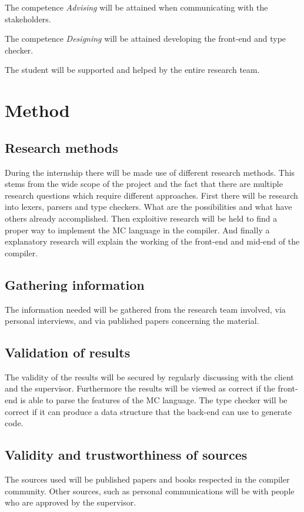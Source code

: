 The competence \emph{Advising} will be attained when communicating with the stakeholders.

The competence \emph{Designing} will be attained developing the front-end and type checker.

The student will be supported and helped by the entire research team.


\section{Method}\label{ch:methodmandate}
\subsection{Research methods}
During the internship there will be made use of different research methods. This stems from
the wide scope of the project and the fact that there are multiple research questions which
require different approaches.
First there will be research into lexers, parsers and type checkers. What are the possibilities
and what have others already accomplished.
Then exploitive research will be held to find a proper way to implement the MC language in
the compiler.
And finally a explanatory research will explain the working of the front-end and mid-end of
the compiler.


\subsection{Gathering information}
The information needed will be gathered from the research team involved, via personal interviews,
and via published papers concerning the material.


\subsection{Validation of results}
The validity of the results will be secured by regularly discussing with the client and the supervisor.
Furthermore the results will be viewed as correct if the front-end is able to parse the
features of the MC language. The type checker will be correct if it can produce a data structure that
the back-end can use to generate code.

\subsection{Validity and trustworthiness of sources}
The sources used will be published papers and books respected in the compiler community.
Other sources, such as personal communications will be with people who are approved by the
supervisor.

